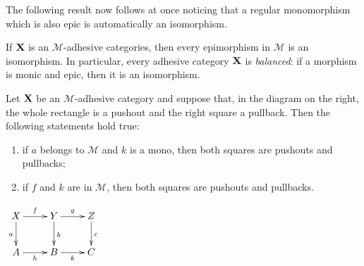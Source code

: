 \documentclass[a4paper,UKenglish,cleveref,pdftex,thm-restate,numberwithinsect,anonymous]{lipics}
\def\X{\textbf {\textup{X}}}
\begin{document}
The following result now follows at once noticing that a regular monomorphism which is also epic is automatically an isomorphism.

\begin{corollary}\label{prop:bal}
	If $\X$ is an $\mathcal{M}$-adhesive categories, then every epimorphism in $\mathcal{M}$ is an isomorphism. In particular, every adhesive category $\X$ is \emph{balanced}: if a morphism is monic and epic, then it is an isomorphism.
\end{corollary}

\noindent 
\parbox{10cm}{\begin{lemma}\label{lem:popb} Let $\X$ be an $\mathcal{M}$-adhesive category  and suppose that, in the diagram on the right, the whole rectangle is a pushout and the right square a pullback.	Then the following statements hold true:
\parbox{13cm}	{\begin{enumerate}
		\item if $a$ belongs to $\mathcal{M}$ and $k$ is a mono,  then both squares are pushouts and pullbacks;
		\item if $f$ and $k $ are in  $\mathcal{M}$, then both squares are pushouts and pullbacks.
	\end{enumerate}}
\end{lemma}}
\parbox{4cm}{\vspace{-1cm}
	$\xymatrix{X \ar[d]_{a} \ar[r]^{f}& \ar[r]^{g} Y \ar[d]^{b}& Z \ar[d]^{c}\\ A \ar[r]_{h}& B \ar[r]_{k}& C}$}\\
\end{document}
